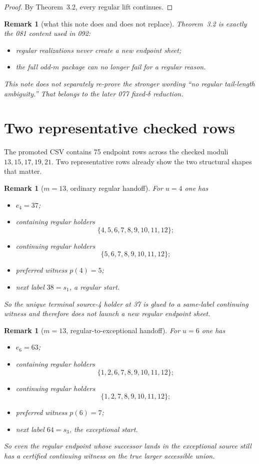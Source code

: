 \documentclass[11pt]{article}
\newtheorem{remark}[theorem]{Remark}
\begin{document}
\begin{proof}
By Theorem~3.2, every regular lift continues.
\end{proof}

\begin{remark}[what this note does and does not replace]
Theorem~3.2 is exactly the 081 content used in 092:
\begin{itemize}[leftmargin=2em]
\item regular realizations never create a new endpoint sheet;
\item the full odd-$m$ package can no longer fail for a regular reason.
\end{itemize}
This note does \emph{not} separately re-prove the stronger wording
``no regular tail-length ambiguity.'' That belongs to the later 077
fixed-$\delta$ reduction.
\end{remark}

\section{Two representative checked rows}

The promoted CSV contains 75 endpoint rows across the checked moduli
$13,15,17,19,21$. Two representative rows already show the two structural
shapes that matter.

\begin{remark}[$m=13$, ordinary regular handoff]
For $u=4$ one has
\begin{itemize}[leftmargin=2em]
\item $e_4 = 37$;
\item containing regular holders
      \[
      \{4,5,6,7,8,9,10,11,12\};
      \]
\item continuing regular holders
      \[
      \{5,6,7,8,9,10,11,12\};
      \]
\item preferred witness $p(4)=5$;
\item next label $38=s_1$, a regular start.
\end{itemize}
So the unique terminal source-4 holder at 37 is glued to a same-label
continuing witness and therefore does not launch a new regular endpoint sheet.
\end{remark}

\begin{remark}[$m=13$, regular-to-exceptional handoff]
For $u=6$ one has
\begin{itemize}[leftmargin=2em]
\item $e_6 = 63$;
\item containing regular holders
      \[
      \{1,2,6,7,8,9,10,11,12\};
      \]
\item continuing regular holders
      \[
      \{1,2,7,8,9,10,11,12\};
      \]
\item preferred witness $p(6)=7$;
\item next label $64=s_3$, the exceptional start.
\end{itemize}
So even the regular endpoint whose successor lands in the exceptional source
still has a certified continuing witness on the true larger accessible union.
\end{remark}
\end{document}
